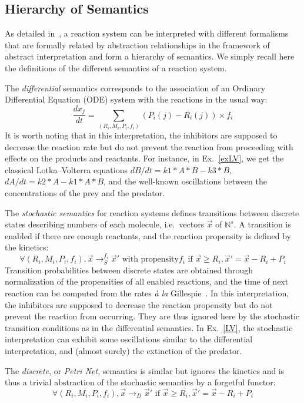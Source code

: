 \documentclass{llncs}
\newcommand{\lra}{\longrightarrow}
\begin{document}
\subsection{Hierarchy of Semantics}

As detailed in~\cite{FS08tcs}, a reaction system can be interpreted with different formalisms
that are formally related by abstraction relationships in the framework of abstract interpretation \cite{CC77popl}
and form a hierarchy of semantics.
We simply recall here the definitions of the different semantics of a reaction system.

The \emph{differential} semantics corresponds to the association of
      an Ordinary Differential Equation (ODE) system with the reactions in the
      usual way:
      \[\frac{dx_j}{dt} = \sum_{(R_i, M_i, P_i, f_i)}(P_i(j) - R_i(j))\times f_i\]
      It is worth noting that in this interpretation, the inhibitors are supposed to decrease the reaction rate but do not prevent the reaction from
      proceeding with effects on the products and reactants.
      For instance, in Ex.~\ref{exLV}, we get the classical Lotka--Volterra equations $dB/dt = k1*A*B-k3*B$, $dA/dt = k2*A-k1*A*B$,
and the well-known oscillations between the concentrations of the prey and the predator.

The \emph{stochastic semantics} for reaction systems defines
transitions between discrete states describing numbers of each molecule, i.e.~vectors $\vec x$ of $\mathbb{N}^s$.
A transition is enabled if there are enough reactants,
and the reaction propensity is defined by the kinetics:
      $$\forall (R_i, M_i, P_i, f_i), {\vec x}\lra_S^{f_i}{\vec x'} \text{ with propensity}f_i\text{ if } {\vec x}\geq R_i, {\vec x'} = {\vec x} - R_i + P_i$$
Transition probabilities between discrete states are obtained through
normalization of the propensities of all enabled reactions,
and the time of next reaction can be computed
from the rates \emph{\`a la} Gillespie~\cite{Gillespie77jpc}.
      In this interpretation, the inhibitors are supposed to decrease the reaction propensity but do not prevent the reaction from occurring.
      They are thus ignored here by the stochastic transition conditions as in the differential semantics.
      In Ex.~\ref{LV}, the stochastic interpretation can exhibit some oscillations similar to the differential interpretation,
      and (almost surely) the extinction of the predator.

      The \emph{discrete}, or \emph{Petri Net}, semantics is similar but ignores the kinetics
      and is thus a trivial abstraction of the stochastic semantics by a forgetful functor:
      $$\forall (R_i, M_i, P_i, f_i), {\vec x}\lra_D{\vec x'}\text{ if }      {\vec x}\geq R_i, {\vec x'} = {\vec x} - R_i + P_i$$
\end{document}
